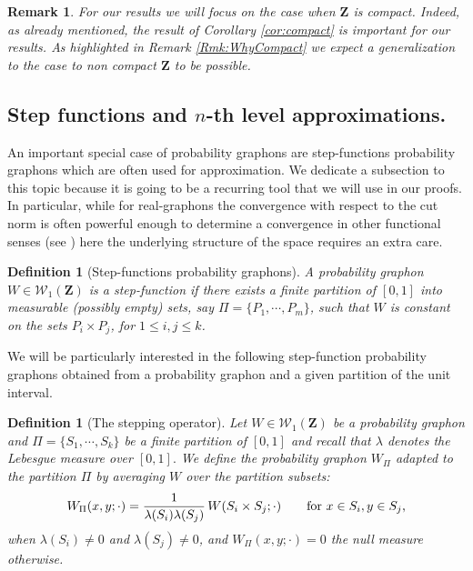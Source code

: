 \documentclass[12pt,twoside,a4paper]{article}
\newtheorem{definition}[theorem]{Definition}
\newtheorem{remark}[theorem]{Remark}
\newcommand{\Space}{\mathbf{Z}}
\newcommand{\Graphon}{\mathcal{W}_1}
\begin{document}
\begin{remark}
For our results we will focus on the case when $\Space$ is compact. Indeed, as already mentioned, the result of Corollary \ref{cor:compact} is important for our results. As highlighted in Remark \ref{Rmk:WhyCompact} we expect a generalization to the case to non compact $\Space$ to be possible.
\end{remark}

\subsection{Step functions and \texorpdfstring{$n$}{n}-th level approximations.} \label{subsec:stepfunctions}
 An important special case of probability graphons are step-functions probability graphons which are often used for approximation. We dedicate a subsection to this topic because it is going to be a recurring tool that we will use in our proofs. In particular, while for real-graphons the convergence with respect to the cut norm is often powerful enough to determine a convergence in other functional senses (see \cite{chatterjee2017large}) here the underlying structure of the space requires an extra care.


\begin{definition}[Step-functions probability graphons]
  \label{def:stepfunction}
A probability graphon $W\in \Graphon(\Space)$ is a \emph{step-function} if there exists a finite partition of $[0,1]$ into measurable (possibly empty) sets, say $\Pi=\{P_1,\cdots,P_m\}$, such that $W$ is constant on the sets $P_i \times  P_j$, for $1\leq i,j\leq  k$.
\end{definition}

 We will be particularly interested in the following step-function probability graphons obtained from a probability graphon and a given partition of the unit interval. 
 
\begin{definition}[The stepping operator]
	\label{def_stepping_operator}
Let $W\in \Graphon(\Space)$ be a probability graphon and  $\Pi=\{S_1,\cdots,S_k\}$ be a finite partition of $[0,1]$ and recall that $\lambda$ denotes the Lebesgue measure over $[0,1].$
We define the probability graphon $W_\Pi$ adapted to the
partition  $\Pi$ by averaging $W$ over the partition subsets:
\[
  W_\Pi(x,y;\cdot) = \frac{1}{\lambda(S_i)\lambda(S_j)}\,
  W(S_i \times S_j;\cdot)
  \qquad \text{for $ x\in S_i, y\in S_j$,}
\]
when $\lambda(S_i)\neq 0$ and $\lambda(S_j)\neq 0$, and $W_\Pi(x,y;\cdot) = 0$ the null measure otherwise.
\end{definition}
\end{document}
